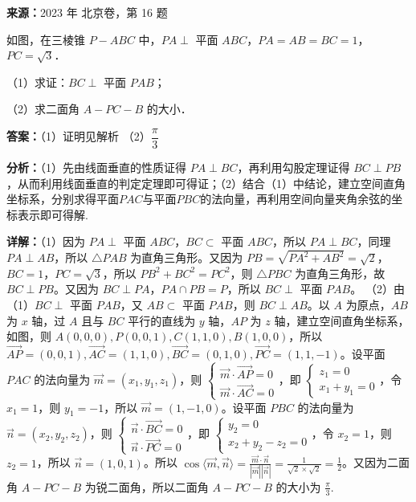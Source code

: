 \begin{question}[points=14]
\textbf{来源：}2023 年 北京卷，第 16 题\par
如图，在三棱锥 $P-ABC$ 中，$PA\perp$ 平面 $ABC$，$PA=AB=BC=1$，$PC=\sqrt{3}$．

（1）求证：$BC\perp$ 平面 $PAB$；

（2）求二面角 $A-PC-B$ 的大小．
\begin{solution}
\textbf{答案：}（1）证明见解析 （2）$\dfrac{\pi}{3}$

\textbf{分析：}（1）先由线面垂直的性质证得 $PA\perp BC$，再利用勾股定理证得 $BC\perp PB$，从而利用线面垂直的判定定理即可得证；（2）结合（1）中结论，建立空间直角坐标系，分别求得平面$PAC$与平面$PBC$的法向量，再利用空间向量夹角余弦的坐标表示即可得解.

\textbf{详解：}（1）因为 $PA\perp$ 平面 $ABC$，$BC\subset$ 平面 $ABC$，所以 $PA\perp BC$，同理 $PA\perp AB$，所以 $\triangle PAB$ 为直角三角形。又因为 $PB=\sqrt{PA^2+AB^2}=\sqrt{2}$，$BC=1$，$PC=\sqrt{3}$，所以 $PB^2+BC^2=PC^2$，则 $\triangle PBC$ 为直角三角形，故 $BC\perp PB$。又因为 $BC\perp PA$，$PA\cap PB=P$，所以 $BC\perp$ 平面 $PAB$。
（2）由（1）$BC\perp$ 平面 $PAB$，又 $AB\subset$ 平面 $PAB$，则 $BC\perp AB$。以 $A$ 为原点，$AB$ 为 $x$ 轴，过 $A$ 且与 $BC$ 平行的直线为 $y$ 轴，$AP$ 为 $z$ 轴，建立空间直角坐标系，如图，则 $A(0,0,0), P(0,0,1), C(1,1,0), B(1,0,0)$，所以 $\overrightarrow{AP}=(0,0,1), \overrightarrow{AC}=(1,1,0), \overrightarrow{BC}=(0,1,0), \overrightarrow{PC}=(1,1,-1)$。设平面 $PAC$ 的法向量为 $\vec{m}=(x_1,y_1,z_1)$，则 $\begin{cases} \vec{m}\cdot\overrightarrow{AP}=0 \\ \vec{m}\cdot\overrightarrow{AC}=0 \end{cases}$，即 $\begin{cases} z_1=0 \\ x_1+y_1=0 \end{cases}$，令 $x_1=1$，则 $y_1=-1$，所以 $\vec{m}=(1,-1,0)$。设平面 $PBC$ 的法向量为 $\vec{n}=(x_2,y_2,z_2)$，则 $\begin{cases} \vec{n}\cdot\overrightarrow{BC}=0 \\ \vec{n}\cdot\overrightarrow{PC}=0 \end{cases}$，即 $\begin{cases} y_2=0 \\ x_2+y_2-z_2=0 \end{cases}$，令 $x_2=1$，则 $z_2=1$，所以 $\vec{n}=(1,0,1)$。所以 $\cos\langle\vec{m},\vec{n}\rangle = \frac{\vec{m}\cdot\vec{n}}{|\vec{m}||\vec{n}|} = \frac{1}{\sqrt{2}\times\sqrt{2}} = \frac12$。又因为二面角 $A-PC-B$ 为锐二面角，所以二面角 $A-PC-B$ 的大小为 $\frac{\pi}{3}$.
\end{solution}
\end{question}

